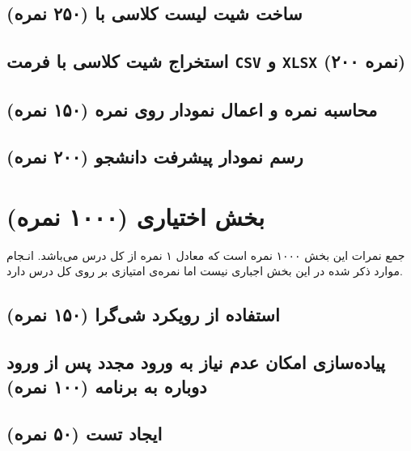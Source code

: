 \documentclass[a4paper]{report}
\begin{document}
\section{ساخت شیت لیست کلاسی با  (۲۵۰ نمره)}


\section{استخراج شیت کلاسی با فرمت \texttt{CSV} و \texttt{XLSX} (۲۰۰ نمره)}


\section{محاسبه نمره و اعمال نمودار روی نمره (۱۵۰ نمره)}


\section{رسم نمودار پیشرفت دانشجو (۲۰۰ نمره)}


\chapter{بخش اختیاری (۱۰۰۰ نمره)}
\begin{center}
    \begin{warningbox}
        \Large
        جمع نمرات این بخش ۱۰۰۰ نمره است که معادل ۱ نمره از کل درس می‌باشد.
        انـجام موارد ذکر شده در این بخش اجباری نیست اما نمره‌ی امتیازی بر روی کل درس دارد.
    \end{warningbox}
\end{center}

\section{استفاده از رویکرد شی‌گرا (۱۵۰ نمره)}


\section{پیاده‌سازی امکان عدم نیاز به ورود مجدد پس از ورود دوباره به برنامه (۱۰۰ نمره)}


\section{ایجاد تست  (۵۰ نمره)}

\end{document}
